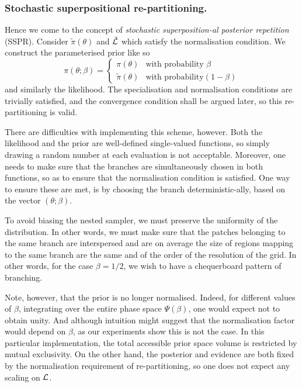 \documentclass[usenatbib]{mnras}
\begin{document}
\subsubsection{Stochastic superpositional re-partitioning.}
\label{sec:org502693d}

Hence we come to the concept of \emph{stochastic superposition-al
posterior repetition} (SSPR). Consider \(\tilde{\pi}(\theta)\) and
\({\cal \tilde{L}}\) which satisfy the normalisation
condition. We construct the parameterised prior like so
\begin{equation}
  \pi(\theta; \beta)  = \begin{cases}
	\pi(\theta) & \text{with probability } \beta\\
	\tilde{\pi}(\theta) & \text{with probability} (1- \beta)
	\end{cases}
\end{equation}
and similarly the likelihood.  The specialisation and
normalisation conditions are trivially satisfied, and the
convergence condition shall be argued later, so this
re-partitioning is valid.

There are difficulties with implementing this scheme,
however. Both the likelihood and the prior are well-defined
single-valued functions, so simply drawing a random number at each
evaluation is not acceptable. Moreover, one needs to make sure
that the branches are simultaneously chosen in both functions, so
as to ensure that the normalisation condition is satisfied. One
way to ensure these are met, is by choosing the branch
deterministic-ally, based on the vector \((\theta; \beta)\). 

To avoid biasing the nested sampler, we must preserve the
uniformity of the distribution. In other words, we must make sure
that the patches belonging to the same branch are interspersed and
are on average the size of regions mapping to the same branch are
the same and of the order of the resolution of the grid. In other
words, for the case \(\beta=1/2\), we wish to have a chequerboard
pattern of branching. 

Note, however, that the prior is no longer normalised. Indeed, for
different values of \(\beta\), integrating over the entire phase
space \(\Psi(\beta)\), one would expect not to obtain unity. And
although intuition might suggest that the normalisation factor
would depend on \(\beta\), as our experiments show this is not the
case. In this particular implementation, the total accessible
prior space volume is restricted by mutual exclusivity. On the
other hand, the posterior and evidence are both fixed by the
normalisation requirement of re-partitioning, so one does not
expect any scaling on \({\cal L}\). 
\end{document}

